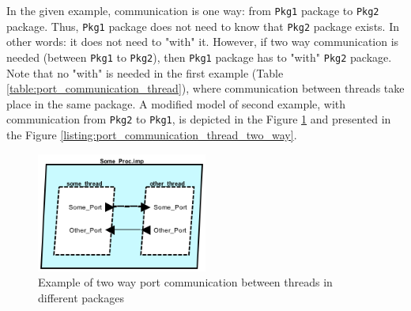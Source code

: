 \clearpage

In the given example, communication is one way: from \lstinline{Pkg1} package to \lstinline{Pkg2} package. Thus, \lstinline{Pkg1} package does not need to know that \lstinline{Pkg2} package exists. In other words: it does not need to "with" it. However, if two way communication is needed (between \lstinline{Pkg1} to \lstinline{Pkg2}), then \lstinline{Pkg1} package has to "with" \lstinline{Pkg2} package. Note that no "with" is needed in the first example (Table \ref{table:port_communication_thread}), where communication between threads take place in the same package. A modified model of second example, with communication from \lstinline{Pkg2} to \lstinline{Pkg1}, is depicted in the Figure \ref{figure:port_communication_thread_two_way} and presented in the Figure \ref{listing:port_communication_thread_two_way}. 

\begin{figure}[h] %
    \begin{center}
    	\includegraphics[width=0.5\textwidth]{figures/port-communication-thread-two-way.png}
    \end{center}
    \caption{Example of two way port communication between threads in different packages}
    \label{figure:port_communication_thread_two_way}
\end{figure}

